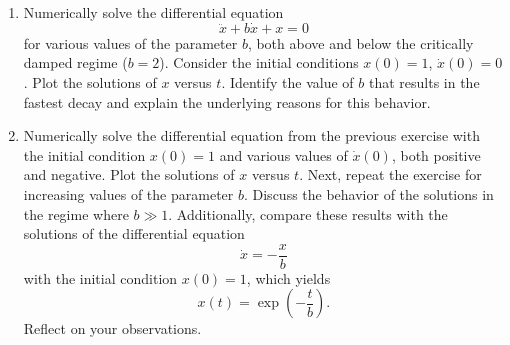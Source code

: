 \begin{enumerate}
    \item Numerically solve the differential equation 
    \begin{equation*}
            \ddot{x} + b \dot{x} + x = 0
    \end{equation*}
    for various values of the parameter $b$, both above and below the critically damped regime ($b = 2$). Consider the initial conditions $x(0)=1$, $\dot{x}(0)=0$. Plot the solutions of $x$ versus $t$. Identify the value of $b$ that results in the fastest decay and explain the underlying reasons for this behavior.
  
    \item Numerically solve the differential equation from the previous exercise with the initial condition $x(0) = 1$ and various values of $\dot{x}(0)$, both positive and negative. Plot the solutions of $x$ versus $t$. Next, repeat the exercise for increasing values of the parameter $b$. Discuss the behavior of the solutions in the regime where $b \gg 1$. Additionally, compare these results with the solutions of the differential equation 
    \begin{equation*}
        \dot{x} = -\frac{x}{b}
    \end{equation*}
    with the initial condition $x(0) = 1$, which yields 
    \begin{equation*}
        x(t) = \exp\left(-\frac{t}{b}\right).
    \end{equation*}
    Reflect on your observations.
  
  \end{enumerate}
  